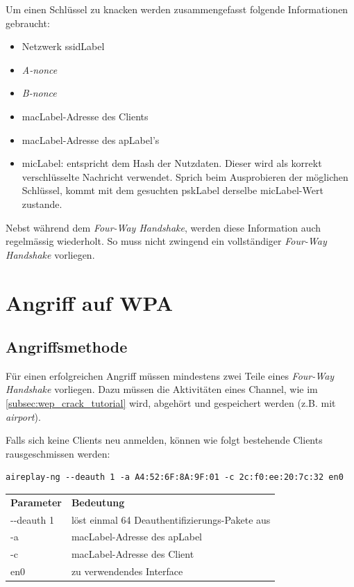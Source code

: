 
Um einen Schlüssel zu knacken werden zusammengefasst folgende Informationen gebraucht:
\begin{itemize}
	\item Netzwerk \gls{ssidLabel}
	\item \textit{A-nonce}
	\item \textit{B-nonce}
	\item \gls{macLabel}-Adresse des Clients
	\item \gls{macLabel}-Adresse des \gls{apLabel}'s
	\item \gls{micLabel}: entspricht dem Hash der Nutzdaten. Dieser wird als korrekt verschlüsselte Nachricht verwendet. Sprich beim Ausprobieren der möglichen Schlüssel, kommt mit dem gesuchten \gls{pskLabel} derselbe \gls{micLabel}-Wert zustande.
\end{itemize}

Nebst während dem \textit{Four-Way Handshake}, werden diese Information auch regelmässig wiederholt.
So muss nicht zwingend ein vollständiger \textit{Four-Way Handshake} vorliegen.


\section{Angriff auf WPA}

\subsection{Angriffsmethode}
Für einen erfolgreichen Angriff müssen mindestens zwei Teile eines \textit{Four-Way Handshake} vorliegen.
Dazu müssen die Aktivitäten eines Channel, wie im \cref{subsec:wep_crack_tutorial} wird, abgehört und gespeichert werden (z.B. mit \textit{airport}).

Falls sich keine Clients neu anmelden, können wie folgt bestehende Clients rausgeschmissen werden:
\begin{lstlisting}[style=lstStyleFramed]
aireplay-ng --deauth 1 -a A4:52:6F:8A:9F:01 -c 2c:f0:ee:20:7c:32 en0
\end{lstlisting}
\begin{tabular}{l l}
	\textbf{Parameter} & \textbf{Bedeutung}\\
	-{}-deauth 1 & löst einmal 64 Deauthentifizierungs-Pakete aus\\
	-a	& \gls{macLabel}-Adresse des \gls{apLabel}\\
	-c	& \gls{macLabel}-Adresse des Client\\
	en0 & zu verwendendes Interface
\end{tabular}

